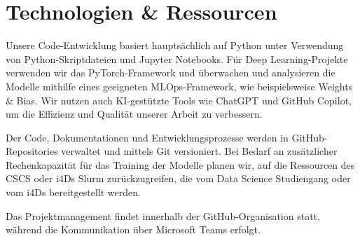 \section{Technologien \& Ressourcen}
Unsere Code-Entwicklung basiert hauptsächlich auf Python unter Verwendung von Python-Skriptdateien und Jupyter Notebooks. Für Deep Learning-Projekte verwenden wir das PyTorch-Framework und überwachen und analysieren die Modelle mithilfe eines geeigneten MLOps-Framework, wie beispielsweise Weights \& Bias. Wir nutzen auch KI-gestützte Tools wie ChatGPT und GitHub Copilot, um die Effizienz und Qualität unserer Arbeit zu verbessern.

Der Code, Dokumentationen und Entwicklungsprozesse werden in GitHub-Repositories verwaltet und mittels Git versioniert. Bei Bedarf an zusätzlicher Rechenkapazität für das Training der Modelle planen wir, auf die Ressourcen des CSCS oder i4Ds Slurm zurückzugreifen, die vom Data Science Studiengang oder vom i4Ds bereitgestellt werden.

Das Projektmanagement findet innerhalb der GitHub-Organisation statt, während die Kommunikation über Microsoft Teams erfolgt.